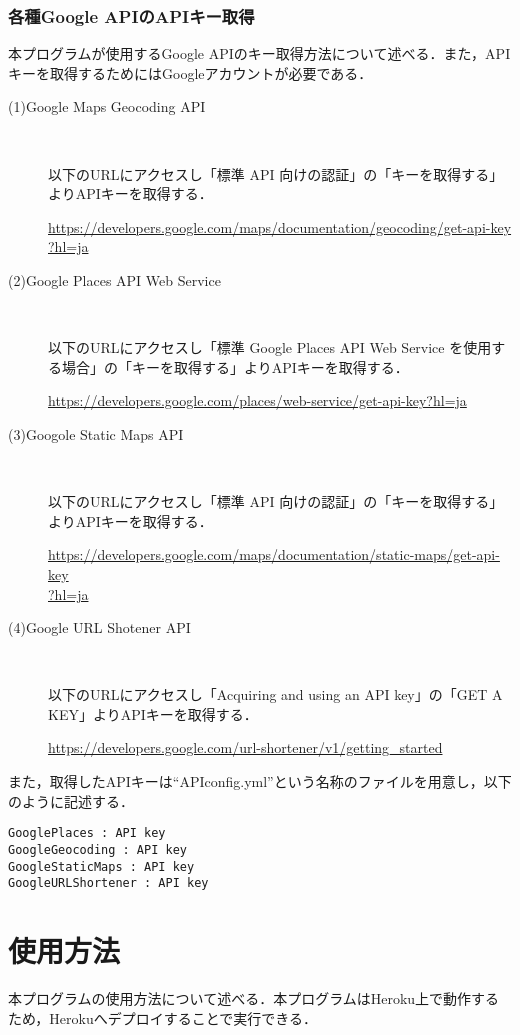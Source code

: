 \documentclass[fleqn, 14pt]{extarticlej}
\begin{document}
\subsubsection{各種Google APIのAPIキー取得}
本プログラムが使用するGoogle APIのキー取得方法について述べる．また，APIキーを取得するためにはGoogleアカウントが必要である．

\begin{description}
\item[(1)Google Maps Geocoding API]\
  
  以下のURLにアクセスし「標準 API 向けの認証」の「キーを取得する」よりAPIキーを取得する．
  
  \url{https://developers.google.com/maps/documentation/geocoding/get-api-key}\\
  \url{?hl=ja}
\item[(2)Google Places API Web Service]\
  
  以下のURLにアクセスし「標準 Google Places API Web Service を使用する場合」の「キーを取得する」よりAPIキーを取得する．
  
  \url{https://developers.google.com/places/web-service/get-api-key?hl=ja}
\item[(3)Googole Static Maps API]\
  
  以下のURLにアクセスし「標準 API 向けの認証」の「キーを取得する」よりAPIキーを取得する．
  
  \url{https://developers.google.com/maps/documentation/static-maps/get-api-key}\\
  \url{?hl=ja}
\item[(4)Google URL Shotener API]\
  
  以下のURLにアクセスし「Acquiring and using an API key」の「GET A KEY」よりAPIキーを取得する．
  
  \url{https://developers.google.com/url-shortener/v1/getting_started}
\end{description}

また，取得したAPIキーは``APIconfig.yml''という名称のファイルを用意し，以下のように記述する．
\begin{verbatim}
GooglePlaces : API key
GoogleGeocoding : API key
GoogleStaticMaps : API key
GoogleURLShortener : API key
\end{verbatim}

\section{使用方法}
本プログラムの使用方法について述べる．本プログラムはHeroku上で動作するため，Herokuへデプロイすることで実行できる．
\end{document}
